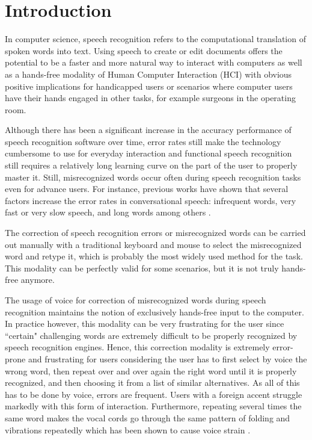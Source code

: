 \documentclass[]{article}
\begin{document}
\section{Introduction}
In computer science, speech recognition refers to the computational translation of spoken words into text.
Using speech to create or edit documents offers the potential to be a faster and more natural way to interact
with computers as well as a hands-free modality of Human Computer Interaction (HCI) with obvious positive implications
for handicapped users or scenarios where computer users have their hands engaged in other tasks, for example surgeons in
the operating room.


Although there has been a significant increase in the accuracy performance of speech recognition software over time,
error rates still make the technology cumbersome to use for everyday interaction and functional speech recognition still
requires a relatively long learning curve on the part of the user to properly master it. Still, misrecognized words
occur often during speech recognition tasks even for advance users. For instance, previous works have shown that several
factors increase the error rates in conversational speech: infrequent words, very fast or very slow speech, and long
words among others \cite{Goldwater2010181}.


The correction of speech recognition errors or misrecognized words can be carried out manually with a traditional
keyboard and mouse to select the misrecognized word and retype it, which is probably the most widely used method for the task. This modality can
be perfectly valid for some scenarios, but it is not truly hands-free anymore.


The usage of voice for correction of misrecognized words during speech recognition maintains the notion of exclusively
hands-free input to the computer. In practice however, this modality can be very frustrating for the user since
``certain" challenging words are extremely difficult to be properly recognized by speech recognition engines. Hence,
this correction modality is extremely error-prone and frustrating for users considering the user has to first select by voice
the wrong word, then repeat over and over again the right word until it is properly recognized, and then choosing it
from a list of similar alternatives. As all of this has to be done by voice, errors are frequent. Users with a
foreign accent struggle markedly with this form of interaction. Furthermore, repeating several times the same word makes
the vocal cords go through the same pattern of folding and vibrations repeatedly which has been shown to cause voice
strain \cite{voiceproblems}.
\end{document}
